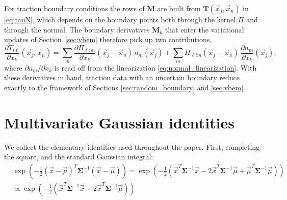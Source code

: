 \documentclass{article}
\begin{document}
For traction boundary conditions the rows of $\mathbf{M}$ are built from $\mathbf{T}(\vec x_j, \vec x_n)$ in \eqref{eq:tauN}, which depends on the boundary points both through the kernel $\Pi$ and through the normal. The boundary derivatives $\mathbf M_k$ that enter the variational updates of Section~\ref{sec:vbem} therefore pick up two contributions,
\begin{equation}
    \frac{\partial T_{i\ell}}{\partial x_k}(\vec x_j, \vec x_n) = \sum_m \frac{\partial \Pi_{\ell i m}}{\partial x_k}(\vec x_j - \vec x_n)\, n_m(\vec x_j) + \sum_m \Pi_{\ell i m}(\vec x_j - \vec x_n)\, \frac{\partial n_m}{\partial x_k}(\vec x_j),
\end{equation}
where $\partial n_m/\partial x_k$ is read off from the linearization \eqref{eq:normal_linearization}. With these derivatives in hand, traction data with an uncertain boundary reduce exactly to the framework of Sections \ref{sec:random_boundary} and \ref{sec:vbem}.

\appendix

\section{Multivariate Gaussian identities} \label{app:identities}
We collect the elementary identities used throughout the paper. First, completing the square, and the standard Gaussian integral:
\begin{align}
    & \exp\left( -\frac{1}{2} (\vec{x}- \vec{\mu})^T \mathbf{\Sigma}^{-1} (\vec{x}-\vec{\mu}) \right)= \exp\left(-\frac{1}{2}(\vec{x}^T \mathbf{\Sigma}^{-1} \vec{x} -2 \vec{x}^T \mathbf{\Sigma}^{-1} \vec{\mu} + \vec{\mu}^T \mathbf{\Sigma}^{-1} \vec{\mu})\right) \nonumber
    \\
    & \propto \exp\left(-\frac{1}{2}(\vec{x}^T \mathbf{\Sigma}^{-1} \vec{x} -2 \vec{x}^T \mathbf{\Sigma}^{-1} \vec{\mu})\right) \label{eq:complete_square}
\end{align}
\end{document}
